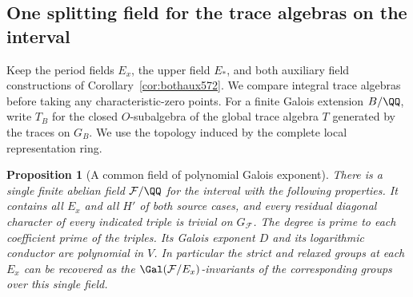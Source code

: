 \documentclass[a4paper,11pt]{article}
\newtheorem{proposition}{Proposition}[section]
\theoremstyle{definition}
\theoremstyle{remark}
\numberwithin{equation}{section}
\begin{document}
\subsection{One splitting field for the trace algebras on the interval}
\label{sec:intervaltrace573}

Keep the period fields \(E_x\), the upper field \(E_*\),
and both auxiliary field constructions of
Corollary~\ref{cor:bothaux572}. We compare integral trace
algebras before taking any characteristic-zero points.
For a finite Galois extension \(B/\QQ\), write \(T_B\)
for the closed \(O\)-subalgebra of the global trace algebra
\(T\) generated by the traces on \(G_B\). We use the
topology induced by the complete local representation ring.

\begin{proposition}[A common field of polynomial Galois exponent]
\leavevmode\label{prop:commonaux573}
There is a single finite abelian field \(\mathcal F/\QQ\)
for the interval with the following properties. It contains
all \(E_x\) and all \(H'\) of both source cases, and every
residual diagonal character of every indicated triple is
trivial on \(G_{\mathcal F}\). The degree is prime to each
coefficient prime of the triples. Its Galois exponent \(D\)
and its logarithmic conductor are polynomial in \(V\).
In particular the strict and relaxed groups at each \(E_x\)
can be recovered as the \(\Gal(\mathcal F/E_x)\)-invariants
of the corresponding groups over this single field.
\end{proposition}
\end{document}
